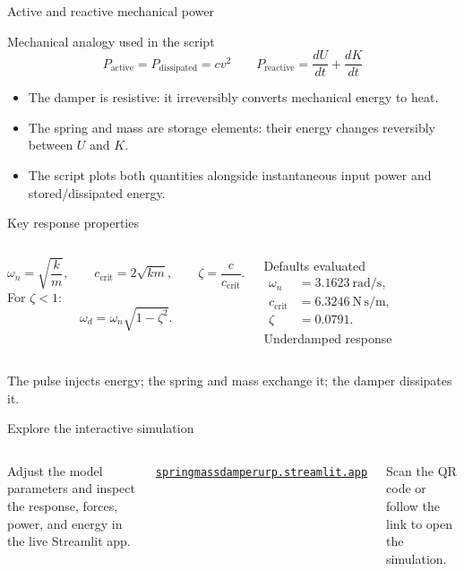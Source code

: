 \documentclass[aspectratio=169,10pt]{beamer}
\begin{document}
\begin{frame}{Active and reactive mechanical power}
\begin{block}{Mechanical analogy used in the script}
\[
\boxed{P_{\mathrm{active}}=P_{\mathrm{dissipated}}=cv^2}
\qquad
\boxed{P_{\mathrm{reactive}}=\frac{dU}{dt}+\frac{dK}{dt}}
\]
\end{block}
\vspace{0.4em}
\begin{itemize}
\item The damper is resistive: it irreversibly converts mechanical energy to heat.
\item The spring and mass are storage elements: their energy changes reversibly between $U$ and $K$.
\item The script plots both quantities alongside instantaneous input power and stored/dissipated energy.
\end{itemize}
\end{frame}

\begin{frame}{Key response properties}
\begin{columns}[c]
\[
\omega_n=\sqrt{\frac{k}{m}},\qquad
c_{\mathrm{crit}}=2\sqrt{km},\qquad
\zeta=\frac{c}{c_{\mathrm{crit}}}.
\]
For $\zeta<1$:
\[
\omega_d=\omega_n\sqrt{1-\zeta^2}.
\]
\begin{block}{Defaults evaluated}
\begin{align*}
\omega_n &= 3.1623\ \mathrm{rad/s},\\
c_{\mathrm{crit}} &= 6.3246\ \mathrm{N\,s/m},\\
\zeta &= 0.0791.
\end{align*}
\centering\alert{Underdamped response}
\end{block}
\end{columns}
\vfill
\centering
\Large The pulse injects energy; the spring and mass exchange it; the damper dissipates it.
\end{frame}

\begin{frame}{Explore the interactive simulation}
\begin{columns}[c]
\Large
Adjust the model parameters and inspect the response, forces, power, and energy in the live Streamlit app.

\vspace{1.2em}
\normalsize
\href{https://springmassdamperurp.streamlit.app/}{\color{Teal}\texttt{springmassdamperurp.streamlit.app}}

\vspace{0.8em}
\small Scan the QR code or follow the link to open the simulation.

\centering
{}
\end{columns}
\end{frame}
\end{document}
